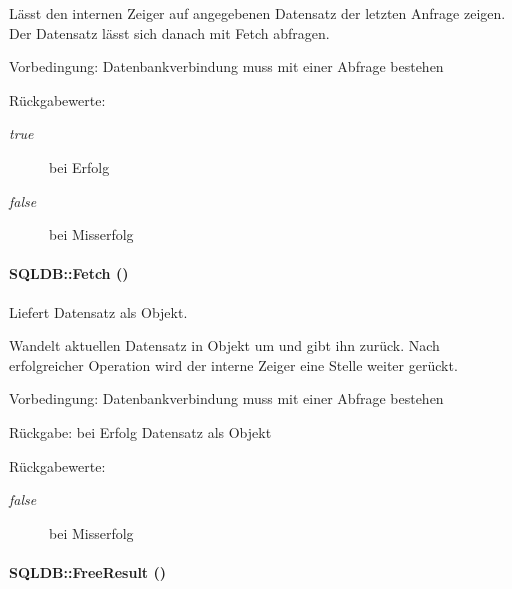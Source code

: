 Lässt den internen Zeiger auf angegebenen Datensatz der letzten Anfrage zeigen. Der Datensatz lässt sich danach mit Fetch abfragen. \begin{Desc}
\item[Vorbedingung:]Datenbankverbindung muss mit einer Abfrage bestehen \end{Desc}
\begin{Desc}
\item[R\"{u}ckgabewerte:]
\begin{description}
\item[{\em true}]bei Erfolg \item[{\em false}]bei Misserfolg \end{description}
\end{Desc}
\hypertarget{classSQLDB_a55c00ce1de0e50e0a58cae61892ba35}{
\paragraph[Fetch]{\setlength{\rightskip}{0pt plus 5cm}SQLDB::Fetch ()}\hfill}
\label{classSQLDB_a55c00ce1de0e50e0a58cae61892ba35}


Liefert Datensatz als Objekt. 

Wandelt aktuellen Datensatz in Objekt um und gibt ihn zurück. Nach erfolgreicher Operation wird der interne Zeiger eine Stelle weiter gerückt. \begin{Desc}
\item[Vorbedingung:]Datenbankverbindung muss mit einer Abfrage bestehen \end{Desc}
\begin{Desc}
\item[R\"{u}ckgabe:]bei Erfolg Datensatz als Objekt \end{Desc}
\begin{Desc}
\item[R\"{u}ckgabewerte:]
\begin{description}
\item[{\em false}]bei Misserfolg \end{description}
\end{Desc}
\hypertarget{classSQLDB_e7da8a2f993c4bb91167a150e07e8b52}{
\paragraph[FreeResult]{\setlength{\rightskip}{0pt plus 5cm}SQLDB::Free\-Result ()}\hfill}
\label{classSQLDB_e7da8a2f993c4bb91167a150e07e8b52}


